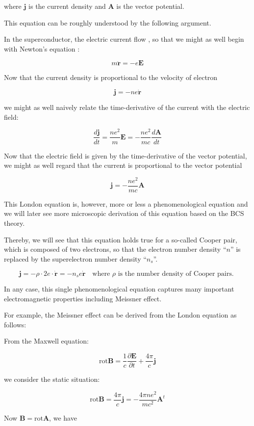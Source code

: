where $\bm{j}$ is the current density and $\bm{A}$ is the vector potential. 

This equation can be roughly understood by the following argument. 

In the superconductor, the electric current flow {}, so that we might as well begin with Newton's equation {}: 

\[m\ddot{\bm{r}} = -e\bm{E} \]

Now that the current density is proportional to the velocity of electron

\[\bm{j} = -ne\dot{\bm{r}} \]

we might as well naively relate the time-derivative of the current with the electric field: 

\[\frac{d\bm{j}}{dt} = \frac{ne^2}{m}\bm{E} = -\frac{ne^2}{mc}\frac{d\bm{A}}{dt} \]

Now that the electric field is given by the time-derivative of the vector potential, we might as well regard that the current is proportional to the vector potential

\[\bm{j} = -\frac{ne^2}{mc}\bm{A} \]

This London equation is, however, more or less a phenomenological equation and we will later see more microscopic derivation of this equation based on the BCS theory. 

Thereby, we will see that this equation holds true for a so-called Cooper pair, which is composed of two electrons, so that the electron number density ``$n$'' is replaced by the superelectron number density ``$n_s$''. 

\[\bm{j} = -\rho\cdot 2e \cdot\dot{\bm{r}} = -n_s e \dot{\bm{r}}\quad \text{where $\rho$ is the number density of Cooper pairs. } \]

In any case, this single phenomenological equation captures many important electromagnetic properties including Meissner effect. 

For example, the Meissner effect can be derived from the London equation as follows: 

From the Maxwell equation: 

\[\text{rot} \bm{B} = \frac{1}{c}\frac{\partial \bm{E}}{\partial t} + \frac{4\pi}{c}\bm{j} \]

we consider the static situation: 

\[\text{rot}\bm{B} = \frac{4\pi}{c}\bm{j} = -\frac{4\pi ne^2}{mc^2}\bm{A}^t \]

Now $\bm{B} = \text{rot}\bm{A}$, we have

